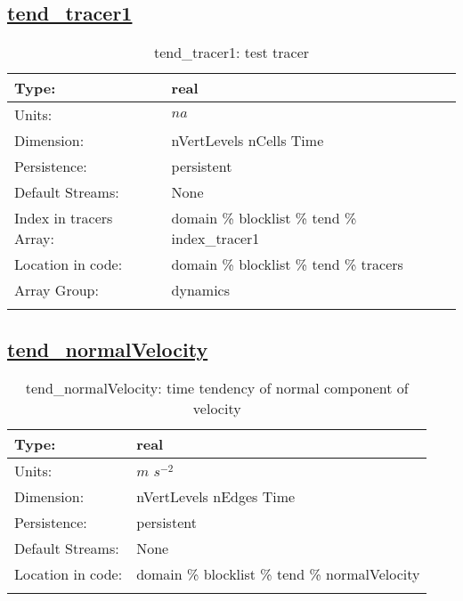 \subsection[tend\_tracer1]{\hyperref[sec:var_tab_tend]{tend\_tracer1}}
\label{subsec:var_sec_tend_tend_tracer1}
\begin{center}
\begin{longtable}{| p{2.0in} | p{4.0in} |}
        \hline 
        Type: & real \\
        \hline 
        Units: & $na$ \\
        \hline 
        Dimension: & nVertLevels nCells Time \\
        \hline 
        Persistence: & persistent \\
        \hline 
		 Default Streams: & None \\
        \hline 
		 Index in tracers Array: & domain \% blocklist \% tend \% index\_tracer1 \\
		 \hline 
		 Location in code: & domain \% blocklist \% tend \% tracers \\
		 \hline 
		 Array Group: & dynamics \\
		 \hline 
    \caption{tend\_tracer1: test tracer}
\end{longtable}
\end{center}
\subsection[tend\_normalVelocity]{\hyperref[sec:var_tab_tend]{tend\_normalVelocity}}
\label{subsec:var_sec_tend_tend_normalVelocity}
\begin{center}
\begin{longtable}{| p{2.0in} | p{4.0in} |}
        \hline 
        Type: & real \\
        \hline 
        Units: & $m$ $s^{-2}$ \\
        \hline 
        Dimension: & nVertLevels nEdges Time \\
        \hline 
        Persistence: & persistent \\
        \hline 
		 Default Streams: & None \\
        \hline 
		 Location in code: & domain \% blocklist \% tend \% normalVelocity \\
		 \hline 
    \caption{tend\_normalVelocity: time tendency of normal component of velocity}
\end{longtable}
\end{center}
